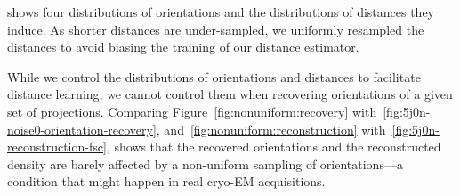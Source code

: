 
 shows four distributions of orientations and the distributions of distances they induce.
As shorter distances are under-sampled, we uniformly resampled the distances to avoid biasing the training of our distance estimator.

While we control the distributions of orientations and distances to facilitate distance learning, we cannot control them when recovering orientations of a given set of projections.
Comparing Figure~\ref{fig:nonuniform:recovery} with~\ref{fig:5j0n-noise0-orientation-recovery}, and~\ref{fig:nonuniform:reconstruction} with~\ref{fig:5j0n-reconstruction-fsc}, shows that the recovered orientations and the reconstructed density are barely affected by a non-uniform sampling of orientations---a condition that might happen in real cryo-EM acquisitions.



